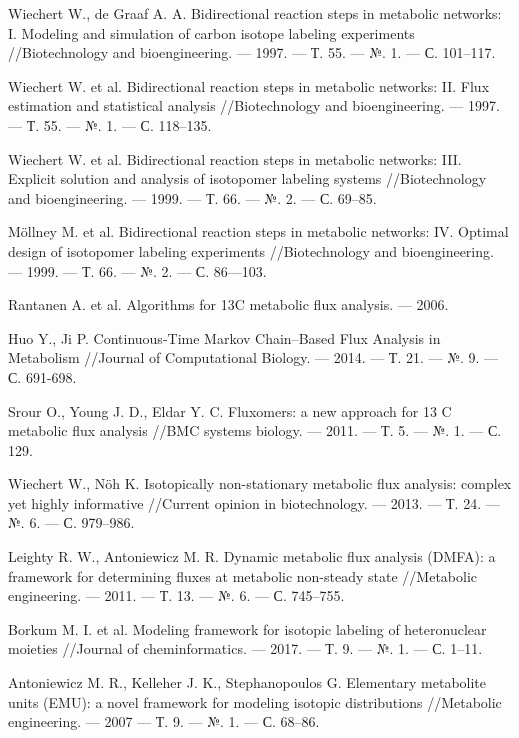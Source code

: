 \documentclass[a4paper, 12pt, left=30mm, right=15mm, top=20mm, bottom=20mm]{report}
\begin{document}
\begin{thebibliography}{XXXX}
	Wiechert W., de Graaf A. A. Bidirectional reaction steps in metabolic networks: I. Modeling and simulation of carbon isotope labeling experiments //Biotechnology and bioengineering. --- 1997. --- Т. 55. --- №. 1. --- С. 101--117.
	
	Wiechert W. et al. Bidirectional reaction steps in metabolic networks: II. Flux estimation and statistical analysis //Biotechnology and bioengineering. --- 1997. --- Т. 55. --- №. 1. --- С. 118--135.
	
	Wiechert W. et al. Bidirectional reaction steps in metabolic networks: III. Explicit solution and analysis of isotopomer labeling systems //Biotechnology and bioengineering. --- 1999. --- Т. 66. --- №. 2. --- С. 69--85.
	
	Möllney M. et al. Bidirectional reaction steps in metabolic networks: IV. Optimal design of isotopomer labeling experiments //Biotechnology and bioengineering. --- 1999. --- Т. 66. --- №. 2. --- С. 86---103.
	
	Rantanen A. et al. Algorithms for 13C metabolic flux analysis. --- 2006.
	
	Huo Y., Ji P. Continuous-Time Markov Chain–Based Flux Analysis in Metabolism //Journal of Computational Biology. --- 2014. --- Т. 21. --- №. 9. --- С. 691-698.
	
	Srour O., Young J. D., Eldar Y. C. Fluxomers: a new approach for 13 C metabolic flux analysis //BMC systems biology. --- 2011. --- Т. 5. --- №. 1. --- С. 129.
	
	Wiechert W., Nöh K. Isotopically non-stationary metabolic flux analysis: complex yet highly informative //Current opinion in biotechnology. --- 2013. --- Т. 24. --- №. 6. --- С. 979--986.
	
	Leighty R. W., Antoniewicz M. R. Dynamic metabolic flux analysis (DMFA): a framework for determining fluxes at metabolic non-steady state //Metabolic engineering. --- 2011. --- Т. 13. --- №. 6. --- С. 745--755.
	
	Borkum M. I. et al. Modeling framework for isotopic labeling of heteronuclear moieties //Journal of cheminformatics. --- 2017. --- Т. 9. --- №. 1. --- С. 1--11.
	
	Antoniewicz M. R., Kelleher J. K., Stephanopoulos G. Elementary metabolite units (EMU): a novel framework for modeling isotopic distributions //Metabolic engineering. --- 2007 --- Т. 9. --- №. 1. --- С. 68--86.
	
\end{thebibliography}
\end{document}

